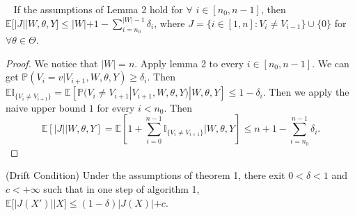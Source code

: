 \begin{lemma}~
 If the assumptions of Lemma 2 hold for $\forall$ $i \in [n_0, n - 1]$, then $\mathbb{E}[|J| | W, \theta, Y] \leq |W|  + 1- \sum_{i = n_0}^{|W| - 1} \delta_i$, where $J = \{i \in [1, n]: V_i \neq V_{i - 1}\} \cup \{ 0 \}$ for $\forall \theta \in \Theta$.
\end{lemma}
\begin{proof}
We notice that $|W| = n$. Apply lemma 2 to every $i \in [n_0, n - 1]$. We can get $\mathbb{P}(V_i = v| V_{i + 1}, W, \theta, Y) \geq \delta_i.$ Then $\mathbb{E} \mathbb{I}_{\{V_i \neq V_{i + 1} \}} = \mathbb{E}[\mathbb{P}(V_i \neq V_{i + 1}| V_{i + 1}, W, \theta, Y) | W, \theta, Y] \leq 1 - \delta_i$. Then we apply the naive upper bound $1$ for every $i < n_0$. Then $$\mathbb{E}[|J| | W, \theta, Y] = \mathbb{E}[1 + \sum_{i = 0}^{n - 1}\mathbb{I}_{\{V_i \neq V_{i + 1}\}}| W, \theta, Y] \leq n + 1 - \sum_{i = n_0} ^ {n - 1} \delta_i.$$
\end{proof}
\begin{proposition}
  (Drift Condition)  Under the assumptions of theorem 1, there exit   $0 < \delta < 1$ and $c < +\infty$ such that in one step of algorithm 1, $\mathbb{E} [|J(X')| |X] \leq (1 - \delta) |J(X)| + c$.
\end{proposition}
